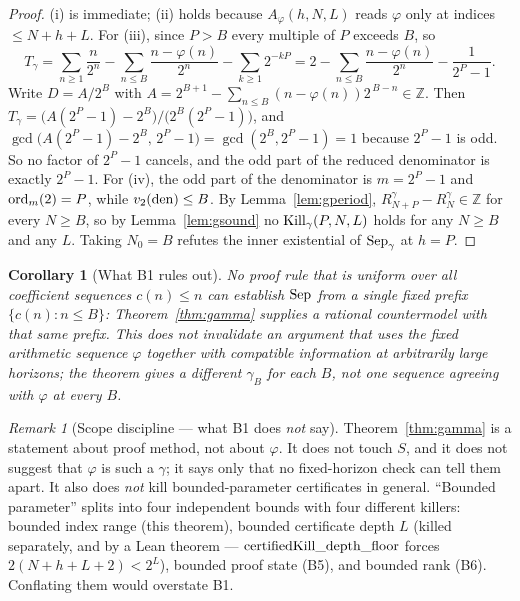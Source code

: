 \documentclass[11pt]{article}
\theoremstyle{plain}
\newtheorem{cor}[thm]{Corollary}
\theoremstyle{definition}
\theoremstyle{remark}
\newtheorem{rem}[thm]{Remark}
\let\origmathrm\mathrm
\renewcommand{\mathrm}[1]{\ifmmode\origmathrm{#1}\else\textrm{#1}\fi}%
\newcommand{\Z}{\mathbb{Z}}
\begin{document}
\begin{proof}
(i) is immediate; (ii) holds because $A_\varphi(h,N,L)$ reads $\varphi$ only at
indices $\le N{+}h{+}L$. For (iii), since $P > B$ every multiple of $P$ exceeds
$B$, so
\[
  T_\gamma
  = \sum_{n\ge1}\frac{n}{2^{n}} - \sum_{n \le B}\frac{n - \varphi(n)}{2^{n}}
    - \sum_{k \ge 1} 2^{-kP}
  = 2 - \sum_{n \le B}\frac{n-\varphi(n)}{2^{n}} - \frac{1}{2^{P}-1}.
\]
Write $D = A/2^{B}$ with $A = 2^{B+1} - \sum_{n \le B}(n-\varphi(n))2^{\,B-n} \in \Z$.
Then $T_\gamma = \bigl(A(2^{P}-1) - 2^{B}\bigr)/\bigl(2^{B}(2^{P}-1)\bigr)$, and
$\gcd\bigl(A(2^{P}-1) - 2^{B},\, 2^{P}-1\bigr) = \gcd(2^{B}, 2^{P}-1) = 1$
because $2^{P}-1$ is odd. So no factor of $2^{P}-1$ cancels, and the odd part
of the reduced denominator is exactly $2^{P}-1$. For (iv), the odd part of the
denominator is $m = 2^{P}-1$ and $\mathrm{ord}_m(2) = P$, while
$v_2(\mathrm{den}) \le B$. By Lemma~\ref{lem:gperiod},
$R^{\gamma}_{N+P} - R^{\gamma}_{N} \in \Z$ for every $N \ge B$, so by
Lemma~\ref{lem:gsound} no $\mathrm{Kill}_\gamma(P,N,L)$ holds for any
$N \ge B$ and any $L$. Taking $N_0 = B$ refutes the inner existential of
$\mathrm{Sep}_\gamma$ at $h = P$.
\end{proof}

\begin{cor}[What B1 rules out]
\label{cor:b1}
No proof rule that is uniform over all coefficient sequences $c(n)\le n$ can
establish $\mathrm{Sep}$ from a single fixed prefix
$\{c(n):n\le B\}$: Theorem~\ref{thm:gamma} supplies a rational countermodel
with that same prefix.  This does \emph{not} invalidate an argument that uses
the fixed arithmetic sequence $\varphi$ together with compatible information
at arbitrarily large horizons; the theorem gives a different $\gamma_B$ for
each $B$, not one sequence agreeing with $\varphi$ at every $B$.
\end{cor}

\begin{rem}[Scope discipline --- what B1 does \emph{not} say]
\label{rem:b1-scope}
Theorem~\ref{thm:gamma} is a statement about proof method, not about $\varphi$.
It does not touch $S$, and it does not suggest that $\varphi$ is such a
$\gamma$; it says only that no fixed-horizon check can tell them apart. It
also does \emph{not} kill bounded-parameter certificates in general.
``Bounded parameter'' splits into four independent bounds with four different
killers: bounded index range (this theorem), bounded certificate depth $L$
(killed separately, and by a Lean theorem ---
$\mathrm{certifiedKill\_depth\_floor}$ forces $2(N{+}h{+}L{+}2) < 2^{L}$),
bounded proof state (B5), and bounded rank (B6). Conflating them would
overstate B1.
\end{rem}
\end{document}
